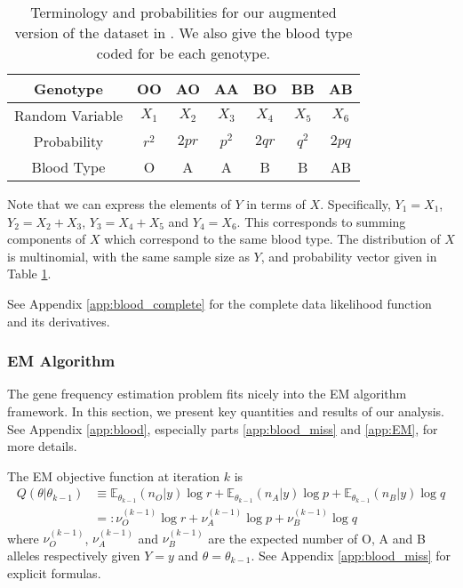 \documentclass[11pt, oneside]{article}   	%
\newcommand{\bE}{\mathbb{E}}
\begin{document}
\begin{table}
    \centering
    \caption{Terminology and probabilities for our augmented version of the dataset in \citet{Fuj78}. We also give the blood type coded for be each genotype.}
    \begin{tabular}{c|cccccc}
        Genotype & OO & AO & AA & BO & BB & AB\\
        \hline
        Random Variable & $X_1$ & $X_2$ & $X_3$ & $X_4$ & $X_5$ & $X_6$\\
        Probability & $r^2$ & $2pr$ & $p^2$ & $2qr$ & $q^2$ & $2pq$\\
        Blood Type & O & A & A & B & B & AB
    \end{tabular}
    
    \label{tab2:blood_type_complete}
\end{table}

Note that we can express the elements of $Y$ in terms of $X$. Specifically, $Y_1 = X_1$, $Y_2 = X_2 + X_3$, $Y_3 = X_4 + X_5$ and $Y_4 = X_6$. This corresponds to summing components of $X$ which correspond to the same blood type. The distribution of $X$ is multinomial, with the same sample size as $Y$, and probability vector given in Table \ref{tab2:blood_type_complete}.

See Appendix \ref{app:blood_complete} for the complete data likelihood function and its derivatives.

\subsubsection{EM Algorithm}

The gene frequency estimation problem fits nicely into the EM algorithm framework. In this section, we present key quantities and results of our analysis. See Appendix \ref{app:blood}, especially parts \ref{app:blood_miss} and \ref{app:EM}, for more details.

The EM objective function at iteration $k$ is
%
\begin{align}
    Q(\theta|\theta_{k-1}) &\equiv  \bE_{\theta_{k-1}}(n_O | y) \log r + \bE_{\theta_{k-1}}(n_A | y) \log p + \bE_{\theta_{k-1}}(n_B | y) \log q\\
    &=: \nu^{(k-1)}_O \log r + \nu^{(k-1)}_A \log p + \nu^{(k-1)}_B \log q
\end{align}
%
where $\nu^{(k-1)}_O$, $\nu^{(k-1)}_A$ and $\nu^{(k-1)}_B$ are the expected number of O, A and B alleles respectively given $Y=y$ and $\theta = \theta_{k-1}$. See Appendix \ref{app:blood_miss} for explicit formulas. %
\end{document}
